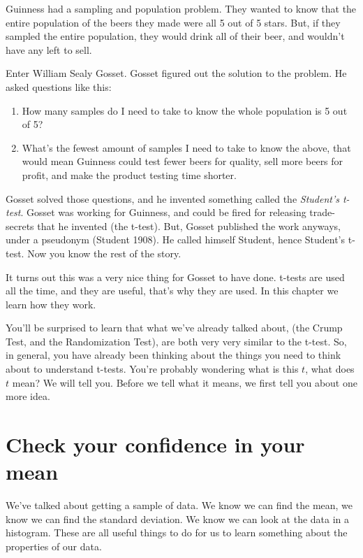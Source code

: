 \documentclass[
  letterpaper,
  DIV=11,
  numbers=noendperiod]{scrreprt}
\begin{document}
Guinness had a sampling and population problem. They wanted to know that
the entire population of the beers they made were all 5 out of 5 stars.
But, if they sampled the entire population, they would drink all of
their beer, and wouldn't have any left to sell.

Enter William Sealy Gosset. Gosset figured out the solution to the
problem. He asked questions like this:

\begin{enumerate}
\def\labelenumi{\arabic{enumi}.}
\item
  How many samples do I need to take to know the whole population is 5
  out of 5?
\item
  What's the fewest amount of samples I need to take to know the above,
  that would mean Guinness could test fewer beers for quality, sell more
  beers for profit, and make the product testing time shorter.
\end{enumerate}

Gosset solved those questions, and he invented something called the
\emph{Student's t-test}. Gosset was working for Guinness, and could be
fired for releasing trade-secrets that he invented (the t-test). But,
Gosset published the work anyways, under a pseudonym (Student 1908). He
called himself Student, hence Student's t-test. Now you know the rest of
the story.

It turns out this was a very nice thing for Gosset to have done. t-tests
are used all the time, and they are useful, that's why they are used. In
this chapter we learn how they work.

You'll be surprised to learn that what we've already talked about, (the
Crump Test, and the Randomization Test), are both very very similar to
the t-test. So, in general, you have already been thinking about the
things you need to think about to understand t-tests. You're probably
wondering what is this \(t\), what does \(t\) mean? We will tell you.
Before we tell what it means, we first tell you about one more idea.

\section{Check your confidence in your
mean}\label{check-your-confidence-in-your-mean}

We've talked about getting a sample of data. We know we can find the
mean, we know we can find the standard deviation. We know we can look at
the data in a histogram. These are all useful things to do for us to
learn something about the properties of our data.
\end{document}
